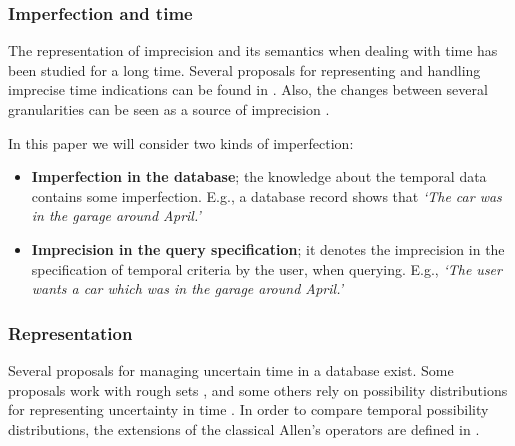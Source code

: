 \subsubsection{Imperfection and time}
The representation of imprecision and its semantics when dealing with time has been studied for a long time. Several proposals for representing and handling imprecise time indications can be found in \cite{DeCaluwe1997,DeTre1997}. Also, the changes between several granularities can be seen as a source of imprecision \cite{Devos1998}.

In this paper we will consider two kinds of imperfection:
\begin{itemize}
\item \textbf{Imperfection in the database}; the knowledge about the temporal data contains some imperfection. E.g., a database record shows that \emph{`The car was in the garage around April.'}
 \item \textbf{Imprecision in the query specification}; it denotes the imprecision in the specification of temporal criteria by the user, when querying. E.g., \emph{`The user wants a car which was in the garage around April.'}
\end{itemize}

\subsubsection{Representation}
Several proposals for managing uncertain time in a database exist. Some proposals work with rough sets \cite{Qiang2009}, and some others rely on possibility distributions for representing uncertainty in time \cite{Dyreson1998,Garrido2009,Galindo2001}. In order to compare temporal possibility distributions, the extensions of the classical Allen's operators \cite{Allen1983} are defined in \cite{Ohlbach2004,Nagypal2003,Dubois2003a,Schockaert2008}.



